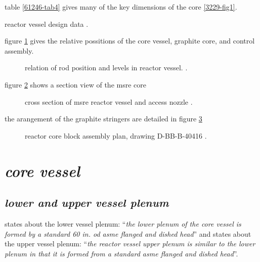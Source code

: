 \documentclass[ms,a4paper]{memoir}
\newcommand*{\mrsarchive}{../../msr-archive}%
\begin{document}
table \ref{61246-tab4} gives many of the key dimensions of the core \ref{3229-fig1}.
\begin{table}[H]
  \centering
  \caption{reactor vessel design data \parencite[table 4]{ad-cf-61-2-46}.}
  \label{61246-tab4}
\end{table}

figure \ref{4233-fig2} gives the relative possitions of the core vessel, graphite core, and control assembly.
\begin{figure}[H]
  \centering
  \caption{relation of rod position and levels in reactor vessel. \parencite[table 4]{ornl-4233}.}
  \label{4233-fig2}
\end{figure}

figure \ref{0728-p109-p110} shows a section view of the msre core
\begin{figure}[H]
  \centering
  \caption{cross section of msre reactor vessel and access nozzle \parencite[page 109-110]{ornl-tm-0728}.}
  \label{0728-p109-p110}
\end{figure}

the arangement of the graphite stringers are detailed in figure \ref{4174-p10-p11}
\begin{figure}[H]
  \centering
  \caption{reactor core block assembly plan, drawing D-BB-B-40416 \parencite[page 13]{ornl-tm-4174}.}
  \label{4174-p10-p11}
\end{figure}

\section{\emph{core vessel}}
\subsection{\emph{lower and upper vessel plenum}}
\textcite[page 14]{ornl-tm-3229} states about the lower vessel plenum:
\enquote{\textit{the lower plenum of the core vessel is formed by a standard 60 in. od asme flanged and dished head}} and \textcite[page 25]{ornl-tm-3229} states about the upper vessel plenum:
\enquote{\textit{the reactor vessel upper plenum is similar to the lower plenum in that it is formed from a standard asme flanged and dished head}}.
\end{document}
